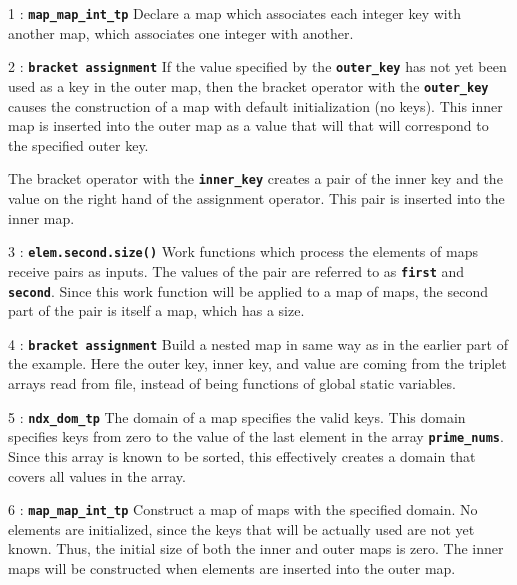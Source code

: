 \documentclass{report}
\begin{document}
\begin{hashitemize}
\item 1 : \texttt{{\bf map\_map\_int\_tp}}
\newline
Declare a map which associates each integer key with another map,
which associates one integer with another.

\item 2 : \texttt{{\bf bracket assignment}}
\newline
If the value specified by the
\texttt{{\bf outer\_key}}
has not yet been used as a key in the outer map, then
the bracket operator with the
\texttt{{\bf outer\_key}}
causes the construction of a map with default initialization (no keys).
This inner map is inserted into the outer map as a value that will
that will correspond to the specified outer key.

The bracket operator with the
\texttt{{\bf inner\_key}}
creates a pair of the inner key and the value on the right hand of the
assignment operator.  This pair is inserted into the inner map.

\item 3 : \texttt{{\bf elem.second.size()}}
\newline
Work functions which process the elements of maps receive pairs as inputs.
The values of the pair are referred to as
\texttt{{\bf first}} and \texttt{{\bf second}}.
Since this work function will be applied to a map of maps, the second part of
the pair is itself a map, which has a size.

\item 4 : \texttt{{\bf bracket assignment}}
\newline
Build a nested map in same way as in the earlier part of the example.
Here the outer key, inner key, and value are coming from the triplet
arrays read from file, instead of being functions of global static variables.

\item 5 : \texttt{{\bf ndx\_dom\_tp}}
\newline
The domain of a map specifies the valid keys.  This domain specifies keys
from zero to the value of the last element in the array
\texttt{{\bf prime\_nums}}.
Since this array is known to be sorted, this effectively creates a domain
that covers all values in the array.

\item 6 : \texttt{{\bf map\_map\_int\_tp}}
\newline
Construct a map of maps with the specified domain.
No elements are initialized, since the keys that will be actually used
are not yet known.  Thus, the initial size of both the inner and outer
maps is zero.  The inner maps will be constructed when elements are inserted
into the outer map.


\end{hashitemize}
\end{document}

